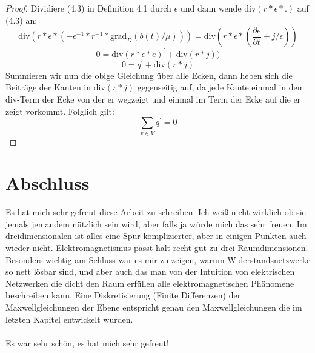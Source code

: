 \documentclass[11pt,a4paper,leqno]{report}
\numberwithin{equation}{chapter}
\begin{document}
\begin{proof}
	
	Dividiere (4.3) in Definition 4.1 durch $\epsilon$ und dann wende $\text{div}(r * \epsilon * .)$ auf (4.3) an:
	$$\text{div}(r * \epsilon * (-\epsilon^{-1} * r^{-1} * \text{grad}_D(b(t) / \mu))) = \text{div}(r * \epsilon * (\frac{\partial e}{\partial t} + j/\epsilon))$$
	$$0 = \text{div}(r * \epsilon * e)^\prime + \text{div}(r * j))$$
	$$0 = q^\prime + \text{div}(r * j)$$
	Summieren wir nun die obige Gleichung \"uber alle Ecken, dann heben sich die Beitr\"age der Kanten in $\text{div}(r*j)$ gegenseitig auf, da jede Kante einmal in dem $\text{div}$-Term der Ecke von der er wegzeigt und einmal im Term der Ecke auf die er zeigt vorkommt. Folglich gilt:
	$$\sum_{v\in V}q^\prime=0$$
\end{proof}
\noindent
\chapter*{Abschluss}
Es hat mich sehr gefreut diese Arbeit zu schreiben. Ich wei\ss{} nicht wirklich ob sie jemals jemandem n\"utzlich sein wird, aber falls ja w\"urde mich das sehr freuen. Im dreidimensionalen ist alles eine Spur komplizierter, aber in einigen Punkten auch wieder nicht. Elektromagnetismus passt halt recht gut zu drei Raumdimensionen. Besonders wichtig am Schluss war es mir zu zeigen, warum Widerstandsnetzwerke so nett l\"osbar sind, und aber auch das man von der Intuition von elektrischen Netzwerken die dicht den Raum erf\"ullen alle elektromagnetischen Ph\"anomene beschreiben kann. Eine Diskretisierung (Finite Differenzen) der Maxwellgleichungen der Ebene entspricht genau den Maxwellgleichungen die im letzten Kapitel entwickelt wurden. \\
\\
Es war sehr sch\"on, es hat mich sehr gefreut!
\end{document}
